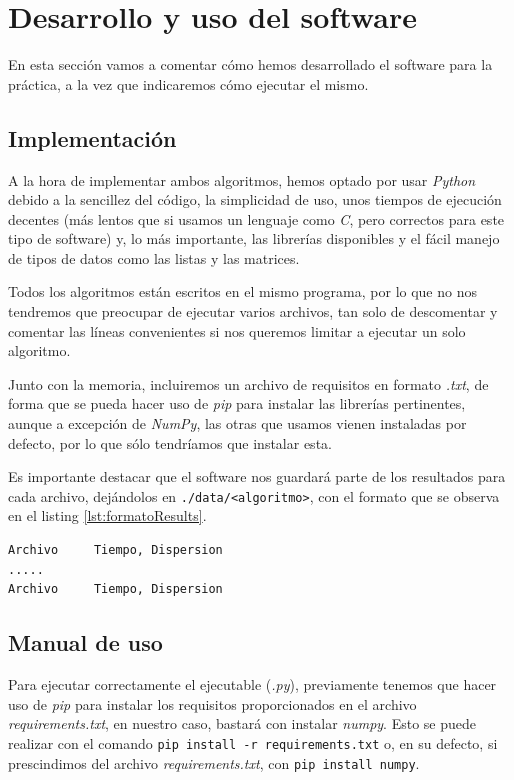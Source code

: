\newpage

\section{Desarrollo y uso del software}

En esta sección vamos a comentar cómo hemos desarrollado el software para la práctica, a la vez que indicaremos cómo ejecutar el mismo.


\subsection{Implementación}

A la hora de implementar ambos algoritmos, hemos optado por usar \textit{Python} debido a la sencillez del código, la simplicidad de uso, unos tiempos de ejecución decentes (más lentos que si usamos un lenguaje como \textit{C}, pero correctos para este tipo de software) y, lo más importante, las librerías disponibles y el fácil manejo de tipos de datos como las listas y las matrices.

Todos los algoritmos están escritos en el mismo programa, por lo que no nos tendremos que preocupar de ejecutar varios archivos, tan solo de descomentar y comentar las líneas convenientes si nos queremos limitar a ejecutar un solo algoritmo.

Junto con la memoria, incluiremos un archivo de requisitos en formato \textit{.txt}, de forma que se pueda hacer uso de \textit{pip} para instalar las librerías pertinentes, aunque a excepción de \textit{NumPy}, las otras que usamos vienen instaladas por defecto, por lo que sólo tendríamos que instalar esta.

Es importante destacar que el software nos guardará parte de los resultados para cada archivo, dejándolos en \texttt{./data/<algoritmo>}, con el formato que se observa en el listing \ref{lst:formatoResults}.

\begin{lstlisting}[frame=single, caption={Formato de los archivos para guardar la evolución de los algoritmos}, captionpos=b, label=lst:formatoResults]
Archivo     Tiempo, Dispersion
.....
Archivo     Tiempo, Dispersion
\end{lstlisting}

\subsection{Manual de uso}

Para ejecutar correctamente el ejecutable (\textit{.py}), previamente tenemos que hacer uso de \textit{pip} para instalar los requisitos proporcionados en el archivo \textit{requirements.txt}, en nuestro caso, bastará con instalar \textit{numpy}.
Esto se puede realizar con el comando \texttt{pip install -r requirements.txt} o, en su defecto, si prescindimos del archivo \textit{requirements.txt}, con \texttt{pip install numpy}.

